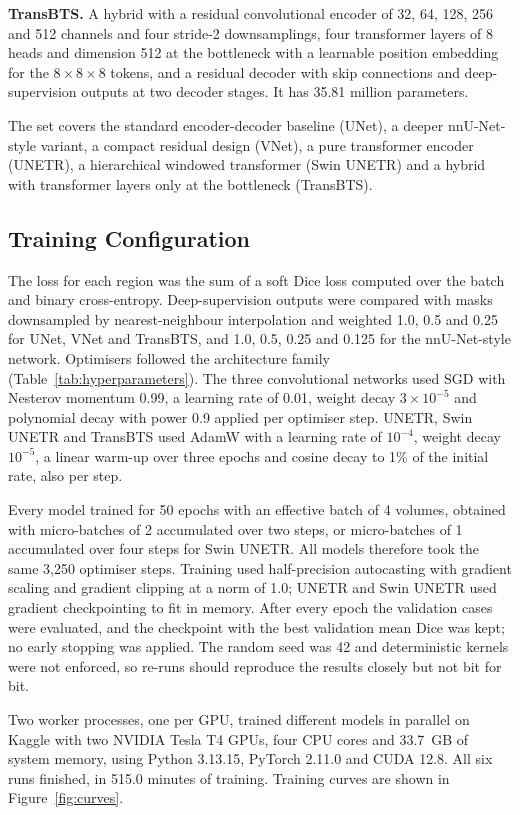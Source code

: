 \documentclass[final,3p,times,number]{elsarticle}
\begin{document}
\textbf{TransBTS.} A hybrid with a residual convolutional encoder of 32, 64, 128, 256 and 512 channels and four stride-2 downsamplings, four transformer layers of 8 heads and dimension 512 at the bottleneck with a learnable position embedding for the $8\times 8\times 8$ tokens, and a residual decoder with skip connections and deep-supervision outputs at two decoder stages. It has 35.81 million parameters.

The set covers the standard encoder-decoder baseline (UNet), a deeper nnU-Net-style variant, a compact residual design (VNet), a pure transformer encoder (UNETR), a hierarchical windowed transformer (Swin UNETR) and a hybrid with transformer layers only at the bottleneck (TransBTS).

\subsection{Training Configuration}

The loss for each region was the sum of a soft Dice loss computed over the batch and binary cross-entropy. Deep-supervision outputs were compared with masks downsampled by nearest-neighbour interpolation and weighted 1.0, 0.5 and 0.25 for UNet, VNet and TransBTS, and 1.0, 0.5, 0.25 and 0.125 for the nnU-Net-style network. Optimisers followed the architecture family (Table~\ref{tab:hyperparameters}). The three convolutional networks used SGD with Nesterov momentum 0.99, a learning rate of 0.01, weight decay $3\times 10^{-5}$ and polynomial decay with power 0.9 applied per optimiser step. UNETR, Swin UNETR and TransBTS used AdamW with a learning rate of $10^{-4}$, weight decay $10^{-5}$, a linear warm-up over three epochs and cosine decay to 1\% of the initial rate, also per step.

Every model trained for 50 epochs with an effective batch of 4 volumes, obtained with micro-batches of 2 accumulated over two steps, or micro-batches of 1 accumulated over four steps for Swin UNETR. All models therefore took the same 3,250 optimiser steps. Training used half-precision autocasting with gradient scaling and gradient clipping at a norm of 1.0; UNETR and Swin UNETR used gradient checkpointing to fit in memory. After every epoch the validation cases were evaluated, and the checkpoint with the best validation mean Dice was kept; no early stopping was applied. The random seed was 42 and deterministic kernels were not enforced, so re-runs should reproduce the results closely but not bit for bit.

Two worker processes, one per GPU, trained different models in parallel on Kaggle with two NVIDIA Tesla T4 GPUs, four CPU cores and 33.7~GB of system memory, using Python 3.13.15, PyTorch 2.11.0 and CUDA 12.8. All six runs finished, in 515.0 minutes of training. Training curves are shown in Figure~\ref{fig:curves}.
\end{document}
